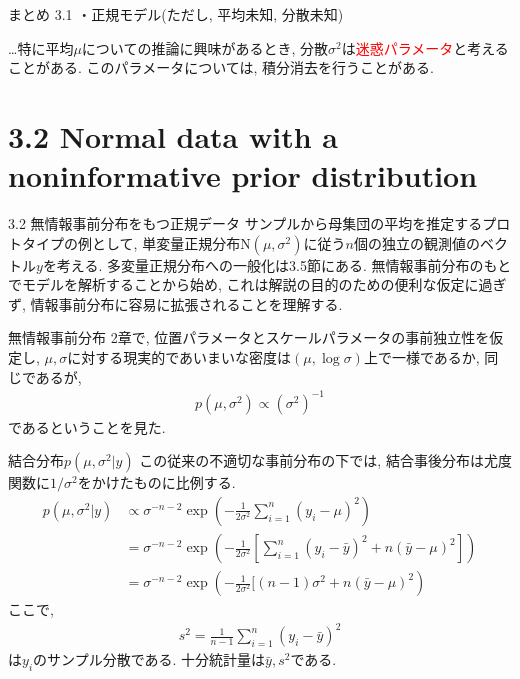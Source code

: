 \documentclass[10pt,dvipdfmx,a4]{beamer}
\newcommand{\eq}[1]{\begin{align}#1\end{align}}
\newcommand{\eqn}[1]{\begin{align*}#1\end{align*}}
\newcommand{\tcr}[1]{\textcolor{red}{#1}}
\begin{document}

\begin{frame}[t]{まとめ 3.1}
・正規モデル(ただし, 平均未知, 分散未知)

…特に平均$\mu$についての推論に興味があるとき, 分散$\sigma^2$は\tcr{迷惑パラメータ}と考えることがある.
このパラメータについては, 積分消去を行うことがある.
\end{frame}

\section{3.2 Normal data with a noninformative prior distribution}
\begin{frame}{3.2 無情報事前分布をもつ正規データ}
サンプルから母集団の平均を推定するプロトタイプの例として, 単変量正規分布$\text{N}(\mu,\sigma^2)$に従う$n$個の独立の観測値のベクトル$y$を考える.
多変量正規分布への一般化は3.5節にある.
無情報事前分布のもとでモデルを解析することから始め, これは解説の目的のための便利な仮定に過ぎず, 情報事前分布に容易に拡張されることを理解する.
\end{frame}


\begin{frame}{無情報事前分布}
2章で, 位置パラメータとスケールパラメータの事前独立性を仮定し, $\mu, \sigma$に対する現実的であいまいな密度は$(\mu, \log \sigma)$上で一様であるか, 同じであるが,
\eqn{p(\mu,\sigma^2)\propto (\sigma^2)^{-1}}
であるということを見た.
\end{frame}


\begin{frame}{結合分布$p(\mu,\sigma^2|y)$}
この従来の不適切な事前分布の下では, 結合事後分布は尤度関数に$1/\sigma^2$をかけたものに比例する.
\eq{p(\mu,\sigma^2|y)&\propto\sigma^{-n-2}\exp\left(-\frac{1}{2\sigma^2}\sum_{i=1}^n(y_i-\mu)^2\right)\nonumber\\
&=\sigma^{-n-2}\exp\left(-\frac{1}{2\sigma^2} \left[ \sum_{i=1}^n(y_i-\bar{y})^2+n(\bar{y}-\mu)^2 \right]\right)\nonumber\\
&=\sigma^{-n-2}\exp\left(-\frac{1}{2\sigma^2}[(n-1)\sigma^2+n(\bar{y}-\mu)^2\right)}
ここで, 
\eqn{s^2=\frac{1}{n-1}\sum_{i=1}^n(y_i-\bar{y})^2}
は$y_i$のサンプル分散である.
十分統計量は$\bar{y}, s^2$である.
\end{frame}
\end{document}
